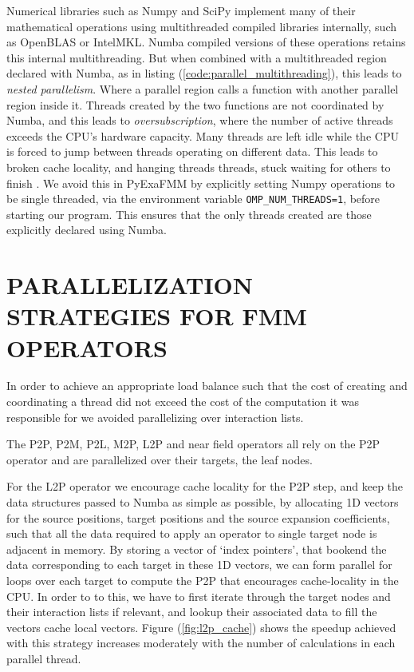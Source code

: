\documentclass{IEEEcsmag}
\begin{document}
Numerical libraries such as Numpy and SciPy implement many of their mathematical operations using multithreaded compiled libraries internally, such as OpenBLAS or IntelMKL. Numba compiled versions of these operations retains this internal multithreading. But when combined with a multithreaded region declared with Numba, as in listing (\ref{code:parallel_multithreading}), this leads to \textit{nested parallelism}. Where a parallel region calls a function with another parallel region inside it. Threads created by the two functions are not coordinated by Numba, and this leads to \textit{oversubscription}, where the number of active threads exceeds the CPU's hardware capacity. Many threads are left idle while the CPU is forced to jump between threads operating on different data. This leads to broken cache locality, and hanging threads threads, stuck waiting for others to finish \cite{Malakhov2016}. We avoid this in PyExaFMM by explicitly setting Numpy operations to be single threaded, via the environment variable \lstinline{OMP_NUM_THREADS=1}, before starting our program. This ensures that the only threads created are those explicitly declared using Numba.



\section{PARALLELIZATION STRATEGIES FOR FMM OPERATORS}

In order to achieve an appropriate load balance such that the cost of creating and coordinating a thread did not exceed the cost of the computation it was responsible for we avoided parallelizing over interaction lists.

The P2P, P2M, P2L, M2P, L2P and near field operators all rely on the P2P operator and are parallelized over their targets, the leaf nodes.

For the L2P operator we encourage cache locality for the P2P step, and keep the data structures passed to Numba as simple as possible, by allocating 1D vectors for the source positions, target positions and the source expansion coefficients, such that all the data required to apply an operator to single target node is adjacent in memory. By storing a vector of `index pointers', that bookend the data corresponding to each target in these 1D vectors, we can form parallel for loops over each target to compute the P2P that encourages cache-locality in the CPU. In order to to this, we have to first iterate through the target nodes and their interaction lists if relevant, and lookup their associated data to fill the vectors cache local vectors. Figure (\ref{fig:l2p_cache}) shows the speedup achieved with this strategy increases moderately with the number of calculations in each parallel thread.
\end{document}
